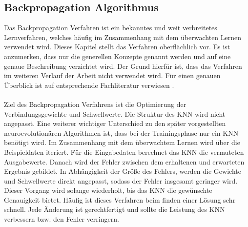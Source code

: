 \subsection{Backpropagation Algorithmus}
\label{subsec:backprop_algo}
Das Backpropagation Verfahren ist ein bekanntes und weit verbreitetes Lernverfahren, welches häufig im Zusammenhang mit dem überwachten Lernen verwendet wird. Dieses Kapitel stellt das Verfahren oberflächlich vor. Es ist anzumerken, dass nur die generellen Konzepte genannt werden und auf eine genaue Beschreibung verzichtet wird. Der Grund hierfür ist, dass das Verfahren im weiteren Verlauf der Arbeit nicht verwendet wird. Für einen genauen Überblick ist auf entsprechende Fachliteratur verwiesen \cite{zell2003simulation}.
\\\\
Ziel des Backpropagation Verfahrens ist die Optimierung der Verbindungsgewichte und Schwellwerte. Die Struktur des \ac{KNN} wird nicht angepasst. Eine weiterer wichtiger Unterschied zu den später vorgestellten neuroevolutionären Algorithmen ist, dass bei der Trainingsphase nur ein \ac{KNN} benötigt wird. Im Zusammenhang mit dem überwachtem Lernen wird über die Beispieldaten iteriert. Für die Eingabedaten berechnet das \ac{KNN} die vermuteten Ausgabewerte. Danach wird der Fehler zwischen dem erhaltenen und erwarteten Ergebnis gebildet. In Abhängigkeit der Größe des Fehlers, werden die Gewichte und Schwellwerte direkt angepasst, sodass der Fehler insgesamt geringer wird. Dieser Vorgang wird solange wiederholt, bis das \ac{KNN} die gewünschte Genauigkeit bietet. Häufig ist dieses Verfahren beim finden einer Lösung sehr schnell. Jede Änderung ist gerechtfertigt und sollte die Leistung des \ac{KNN} verbessern bzw. den Fehler verringern.  


